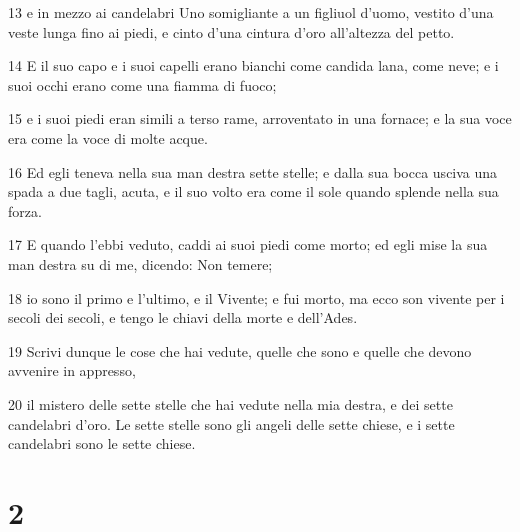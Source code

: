 \par 13 e in mezzo ai candelabri Uno somigliante a un figliuol d'uomo, vestito d'una veste lunga fino ai piedi, e cinto d'una cintura d'oro all'altezza del petto.
\par 14 E il suo capo e i suoi capelli erano bianchi come candida lana, come neve; e i suoi occhi erano come una fiamma di fuoco;
\par 15 e i suoi piedi eran simili a terso rame, arroventato in una fornace; e la sua voce era come la voce di molte acque.
\par 16 Ed egli teneva nella sua man destra sette stelle; e dalla sua bocca usciva una spada a due tagli, acuta, e il suo volto era come il sole quando splende nella sua forza.
\par 17 E quando l'ebbi veduto, caddi ai suoi piedi come morto; ed egli mise la sua man destra su di me, dicendo: Non temere;
\par 18 io sono il primo e l'ultimo, e il Vivente; e fui morto, ma ecco son vivente per i secoli dei secoli, e tengo le chiavi della morte e dell'Ades.
\par 19 Scrivi dunque le cose che hai vedute, quelle che sono e quelle che devono avvenire in appresso,
\par 20 il mistero delle sette stelle che hai vedute nella mia destra, e dei sette candelabri d'oro. Le sette stelle sono gli angeli delle sette chiese, e i sette candelabri sono le sette chiese.

\chapter{2}

